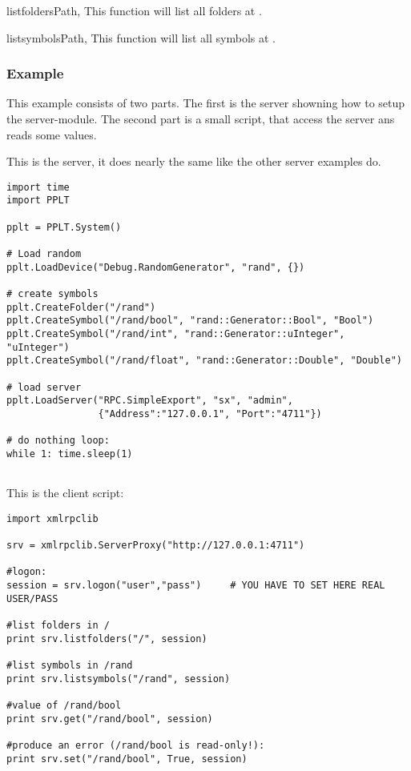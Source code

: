 \begin{funcdescni}{listfolders}{Path, }
This function will list all folders at .
\end{funcdescni}


\begin{funcdescni}{listsymbols}{Path, }
This function will list all symbols at .
\end{funcdescni}


\subsubsection{Example}
This example consists of two parts. The first is the server showning
how to setup the server-module. The second part is a small script, that
access the server ans reads some values.

This is the server, it does nearly the same like the other server examples do.
\begin{verbatim}
import time
import PPLT

pplt = PPLT.System()

# Load random
pplt.LoadDevice("Debug.RandomGenerator", "rand", {})

# create symbols
pplt.CreateFolder("/rand")
pplt.CreateSymbol("/rand/bool", "rand::Generator::Bool", "Bool")
pplt.CreateSymbol("/rand/int", "rand::Generator::uInteger", "uInteger")
pplt.CreateSymbol("/rand/float", "rand::Generator::Double", "Double")

# load server
pplt.LoadServer("RPC.SimpleExport", "sx", "admin", 
                {"Address":"127.0.0.1", "Port":"4711"})

# do nothing loop:
while 1: time.sleep(1)
    
\end{verbatim}


This is the client script:
\begin{verbatim}
import xmlrpclib

srv = xmlrpclib.ServerProxy("http://127.0.0.1:4711")

#logon:
session = srv.logon("user","pass")     # YOU HAVE TO SET HERE REAL USER/PASS

#list folders in /
print srv.listfolders("/", session)

#list symbols in /rand
print srv.listsymbols("/rand", session)

#value of /rand/bool
print srv.get("/rand/bool", session)

#produce an error (/rand/bool is read-only!):
print srv.set("/rand/bool", True, session)
\end{verbatim}
